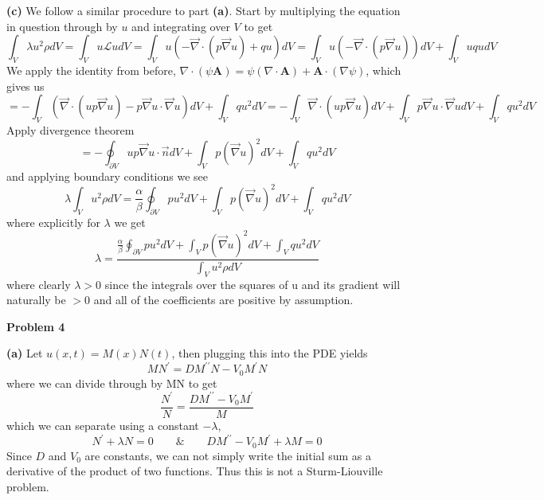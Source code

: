 \documentclass[10pt]{article}
\newcommand{\Lu}{\mathcal{L}}
\begin{document}
\textbf{(c)}
We follow a similar procedure to part \textbf{(a)}. Start by multiplying the equation in question through by $u$ and integrating over $V$ to get
$$\int_{V}\lambda u^{2}\rho dV = \int_{V}u\Lu udV = \int_{V}u\left(-\vec{\nabla} \cdot ( p \vec{\nabla}u ) + qu \right)dV = \int_{V}u\left(-\vec{\nabla} \cdot ( p \vec{\nabla}u )\right)dV +\int_{V} uqu dV$$
We apply the identity from before, $\nabla \cdot (\psi \textbf{A}) = \psi(\nabla \cdot \textbf{A}) + \textbf{A} \cdot (\nabla \psi)$, which gives us
$$=-\int_{V}\left(\vec{\nabla} \cdot (u p \vec{\nabla}u ) - p\vec{\nabla}u \cdot \vec{\nabla}u \right)dV + \int_{V}qu^{2} dV=-\int_{V}\vec{\nabla} \cdot (u p \vec{\nabla}u )dV + \int_{V}p\vec{\nabla}u \cdot \vec{\nabla}u dV + \int_{V}qu^{2} dV $$
Apply divergence theorem
$$=-\oint_{\partial V}u p \vec{\nabla}u \cdot \vec{n} dV + \int_{V}p\left(\vec{\nabla}u\right)^{2} dV + \int_{V}qu^{2} dV $$
and applying boundary conditions we see
$$\lambda \int_{V}u^{2} \rho dV=\frac{\alpha}{\beta}\oint_{\partial V}pu^{2} dV + \int_{V}p\left(\vec{\nabla}u\right)^{2} dV + \int_{V}qu^{2} dV $$
where explicitly for $\lambda$ we get
$$\lambda = \frac{\frac{\alpha}{\beta}\oint_{\partial V}pu^{2} dV + \int_{V}p\left(\vec{\nabla}u\right)^{2} dV + \int_{V}qu^{2} dV}{\int_{V}u^{2} \rho dV}$$
where clearly $\lambda > 0$ since the integrals over the squares of u and its gradient will naturally be $>0$ and all of the coefficients are positive by assumption.

\newpage
\textbf{Problem 4}

\textbf{(a)}
Let $u(x,t) = M(x)N(t)$, then plugging this into the PDE yields
$$MN^{\prime} = DM^{\prime\prime}N - V_{0}M^{\prime}N$$
where we can divide through by MN to get
$$\frac{N^{\prime}}{N} = \frac{ DM^{\prime\prime} - V_{0}M^{\prime}}{M}$$
which we can separate using a constant $-\lambda$,
$$N^{\prime} + \lambda N = 0 \hspace{2em} \& \hspace{2em} DM^{\prime\prime} - V_{0}M^{\prime} + \lambda M = 0$$
Since $D$ and $V_{0}$ are constants, we can not simply write the initial sum as a derivative of the product of two functions. Thus this is not a Sturm-Liouville problem.
\end{document}
